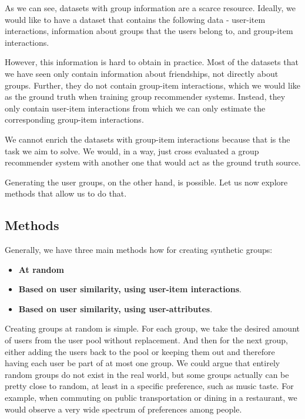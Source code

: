 As we can see, datasets with group information are a scarce resource. Ideally, we would like to have a dataset that contains the following data - user-item interactions, information about groups that the users belong to, and group-item interactions.

However, this information is hard to obtain in practice. Most of the datasets that we have seen only contain information about friendships, not directly about groups. Further, they do not contain group-item interactions, which we would like as the ground truth when training group recommender systems. Instead, they only contain user-item interactions from which we can only estimate the corresponding group-item interactions.

We cannot enrich the datasets with group-item interactions because that is the task we aim to solve. We would, in a way, just cross evaluated a group recommender system with another one that would act as the ground truth source.

Generating the user groups, on the other hand, is possible. Let us now explore methods that allow us to do that.


\subsection{Methods}

Generally, we have three main methods how for creating synthetic groups:
\begin{itemize}
    \item \textbf{At random}
    \item \textbf{Based on user similarity, using user-item interactions}.
    \item \textbf{Based on user similarity, using user-attributes}.
\end{itemize}

Creating groups at random is simple. For each group, we take the desired amount of users from the user pool without replacement. And then for the next group, either adding the users back to the pool or keeping them out and therefore having each user be part of at most one group. We could argue that entirely random groups do not exist in the real world, but some groups actually can be pretty close to random, at least in a specific preference, such as music taste. For example, when commuting on public transportation or dining in a restaurant, we would observe a very wide spectrum of preferences among people.

